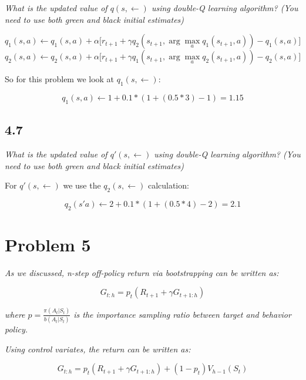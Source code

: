 \documentclass{article}
\begin{document}
\textit{What is the updated value of $q(s, \leftarrow)$ using double-Q learning algorithm? (You need to use both green and black initial estimates)}

\begin{equation}
    q_{1}(s, a) \leftarrow q_{1}(s, a) + \alpha \bigl[r_{t+1} + \gamma q_{2}(s_{t+1}, \arg\max_{a} q_{1}(s_{t+1},a)) - q_{1}(s, a) \bigr]
\end{equation}
\begin{equation}
    q_{2}(s, a) \leftarrow q_{2}(s, a) + \alpha \bigl[r_{t+1} + \gamma q_{1}(s_{t+1}, \arg\max_{a} q_{2}(s_{t+1},a))- q_{2}(s, a) \bigr]
\end{equation}

So for this problem we look at $q_1(s,\leftarrow)$:

\begin{equation}
    q_1(s,a) \leftarrow 1 + 0.1 * (1 + (0.5* 3) - 1  ) = 1.15
\end{equation}

\subsection*{4.7}

\textit{What is the updated value of $q'(s,\leftarrow)$ using double-Q learning algorithm? (You need to use both green and black initial estimates)}

For $q'(s,\leftarrow)$ we use the $q_2(s,\leftarrow)$ calculation:

\begin{equation}
    q_2(s'a) \leftarrow 2 + 0.1 * (1 + (0.5 * 4) - 2) = 2.1
\end{equation}


\section*{Problem 5}

\textit{As we discussed, n-step off-policy return via bootstrapping can be written as:}

\begin{equation}
    G_{t:h} = p_t(R_{t+1} + \gamma G_{t+1:h})
\end{equation}

\textit{where $p=\frac{\pi(A_t|S_t)}{b(A_t|S_t)}$ is the importance sampling ratio between target and behavior policy.}

\textit{Using control variates, the return can be written as:}

\begin{equation}
    G_{t:h} = p_t(R_{t+1}+\gamma G_{t+1:h}) + (1-p_t) V_{h-1} (S_t)
\end{equation}
\end{document}
